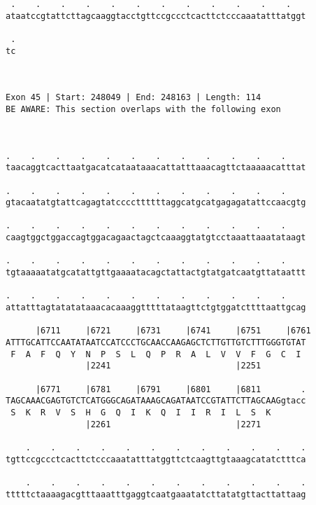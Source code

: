 \documentclass{article}
\begin{document}
\begin{Verbatim}
 .    .    .    .    .    .    .    .    .    .    .    .   
ataatccgtattcttagcaaggtacctgttccgccctcacttctcccaaatatttatggt
                                                            
 .
tc
  
  
 
Exon 45 | Start: 248049 | End: 248163 | Length: 114
BE AWARE: This section overlaps with the following exon



.    .    .    .    .    .    .    .    .    .    .    .    
taacaggtcacttaatgacatcataataaacattatttaaacagttctaaaaacatttat
                                                            
.    .    .    .    .    .    .    .    .    .    .    .    
gtacaatatgtattcagagtatccccttttttaggcatgcatgagagatattccaacgtg
                                                            
.    .    .    .    .    .    .    .    .    .    .    .    
caagtggctggaccagtggacagaactagctcaaaggtatgtcctaaattaaatataagt
                                                            
.    .    .    .    .    .    .    .    .    .    .    .    
tgtaaaaatatgcatattgttgaaaatacagctattactgtatgatcaatgttataattt
                                                            
.    .    .    .    .    .    .    .    .    .    .    .    
attatttagtatatataaacacaaaggtttttataagttctgtggatcttttaattgcag
                                                            
      |6711     |6721     |6731     |6741     |6751     |6761
ATTTGCATTCCAATATAATCCATCCCTGCAACCAAGAGCTCTTGTTGTCTTTGGGTGTAT
 F  A  F  Q  Y  N  P  S  L  Q  P  R  A  L  V  V  F  G  C  I 
                |2241                         |2251         
  
      |6771     |6781     |6791     |6801     |6811        .
TAGCAAACGAGTGTCTCATGGGCAGATAAAGCAGATAATCCGTATTCTTAGCAAGgtacc
 S  K  R  V  S  H  G  Q  I  K  Q  I  I  R  I  L  S  K       
                |2261                         |2271         
  
    .    .    .    .    .    .    .    .    .    .    .    .
tgttccgccctcacttctcccaaatatttatggttctcaagttgtaaagcatatctttca
                                                            
    .    .    .    .    .    .    .    .    .    .    .    .
tttttctaaaagacgtttaaatttgaggtcaatgaaatatcttatatgttacttattaag
                                                            

\end{Verbatim}
\end{document}
